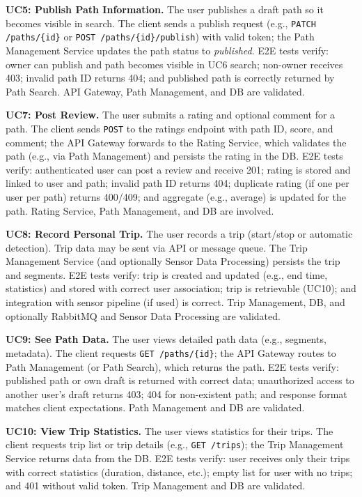 \textbf{UC5: Publish Path Information.}
The user publishes a draft path so it becomes visible in search. The client sends a publish request (e.g., \texttt{PATCH /paths/\{id\}} or \texttt{POST /paths/\{id\}/publish}) with valid token; the Path Management Service updates the path status to \emph{published}. E2E tests verify: owner can publish and path becomes visible in UC6 search; non-owner receives 403; invalid path ID returns 404; and published path is correctly returned by Path Search. API Gateway, Path Management, and DB are validated.

\textbf{UC7: Post Review.}
The user submits a rating and optional comment for a path. The client sends \texttt{POST} to the ratings endpoint with path ID, score, and comment; the API Gateway forwards to the Rating Service, which validates the path (e.g., via Path Management) and persists the rating in the DB. E2E tests verify: authenticated user can post a review and receive 201; rating is stored and linked to user and path; invalid path ID returns 404; duplicate rating (if one per user per path) returns 400/409; and aggregate (e.g., average) is updated for the path. Rating Service, Path Management, and DB are involved.

\textbf{UC8: Record Personal Trip.}
The user records a trip (start/stop or automatic detection). Trip data may be sent via API or message queue. The Trip Management Service (and optionally Sensor Data Processing) persists the trip and segments. E2E tests verify: trip is created and updated (e.g., end time, statistics) and stored with correct user association; trip is retrievable (UC10); and integration with sensor pipeline (if used) is correct. Trip Management, DB, and optionally RabbitMQ and Sensor Data Processing are validated.

\textbf{UC9: See Path Data.}
The user views detailed path data (e.g., segments, metadata). The client requests \texttt{GET /paths/\{id\}}; the API Gateway routes to Path Management (or Path Search), which returns the path. E2E tests verify: published path or own draft is returned with correct data; unauthorized access to another user's draft returns 403; 404 for non-existent path; and response format matches client expectations. Path Management and DB are validated.

\textbf{UC10: View Trip Statistics.}
The user views statistics for their trips. The client requests trip list or trip details (e.g., \texttt{GET /trips}); the Trip Management Service returns data from the DB. E2E tests verify: user receives only their trips with correct statistics (duration, distance, etc.); empty list for user with no trips; and 401 without valid token. Trip Management and DB are validated.

